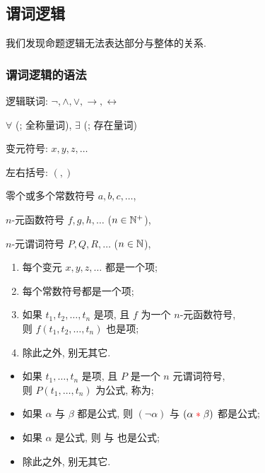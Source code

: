 \subsection{谓词逻辑}

我们发现命题逻辑无法表达部分与整体的关系. 

\subsubsection{谓词逻辑的语法}

\begin{definition}[谓词逻辑的构成]
      \item [逻辑联词:] $\lnot, \land, \lor, \to, \leftrightarrow$
      \item [\purple{量词符号:}] $\forall$ (; 全称量词),
        $\exists$ (; 存在量词)
      \item [变元符号:] $x, y, z, \dots$
      \item [左右括号:] $(, )$
      \item [\cyan{常数符号:}] 零个或多个常数符号 $a, b, c, \dots$, 
      \item [\blue{函数符号:}] $n$-元函数符号 $f, g, h, \dots$ ($n \in \mathbb{N}^{+}$), 
      \item [\red{谓词符号:}] $n$-元谓词符号 $P, Q, R, \dots$ ($n \in \mathbb{N}$), 
    
\end{definition}

\begin{definition}[项 (Term)]
  \begin{enumerate}
    \item 每个变元 $x, y, z, \dots$ 都是一个项;
    \item 每个常数符号都是一个项;
    \item 如果 $t_{1}, t_{2}, \dots, t_{n}$ 是项,
      且 $f$ 为一个 $n$-元函数符号, \\
      则 $f(t_{1}, t_{2}, \dots, t_{n})$ 也是项;
    \item 除此之外, 别无其它. 
  \end{enumerate}
\end{definition}

\begin{definition}[公式 (Formula)]
  \begin{itemize}
    \item 如果 $t_{1}, \dots, t_{n}$ 是项, 且 $P$ 是一个 $n$ 元谓词符号, \\
      则 $P(t_{1}, \dots, t_{n})$ 为公式, 称为;
    \item 如果 $\alpha$ 与 $\beta$ 都是公式, 则 $(\lnot \alpha)$
      与 $(\alpha \;\textcolor{red}{\ast}\; \beta)$ 都是公式;
    \item 如果 $\alpha$ 是公式, 则 
      与  也是公式;
    \item 除此之外, 别无其它. 
  \end{itemize}
\end{definition}

